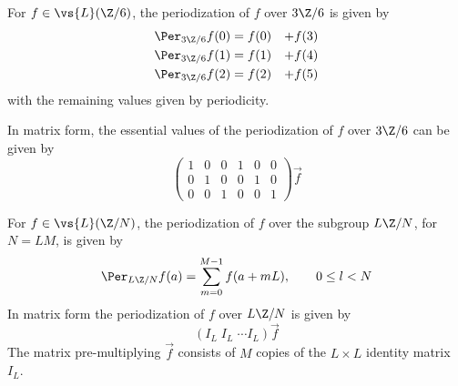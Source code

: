 \begin{example}
For $f\in \vs{L}(\Z/6)$, the periodization of $f$ over $3\Z/6$ is given by 
\begin{alignat*}{2}
\Per_{3\Z/6} f(0) &= f(0) &+ f(3)\\
\Per_{3\Z/6} f(1) &= f(1) &+ f(4)\\
\Per_{3\Z/6} f(2) &= f(2) &+ f(5)
\end{alignat*}
with the remaining values given by periodicity.
\end{example}

In matrix form, the essential values of the periodization of $f$ over $3\Z/6$
can be given by
\[
\begin{pmatrix}%
1&0&0&1&0&0\\
0&1&0&0&1&0\\
0&0&1&0&0&1
\end{pmatrix}\vec{f}
\]
\begin{example}
For $f\in \vs{L}(\Z/N)$, the periodization of $f$ over the subgroup $L\Z/N$, for
$N= LM$, is given by 
\[
\Per_{L\Z/N} f(a) = \sum_{m=0}^{M-1} f(a+mL), \qquad 0 \leq l < N
\]
In matrix form the periodization of $f$ over $L\Z/N$ is given by 
\[
\left( I_L\; I_L\; \cdots I_L \right) \vec{f}
\]
The matrix pre-multiplying $\vec{f}$ consists of $M$ copies of the 
$L\times L$ identity matrix $I_L$. 
\end{example}

